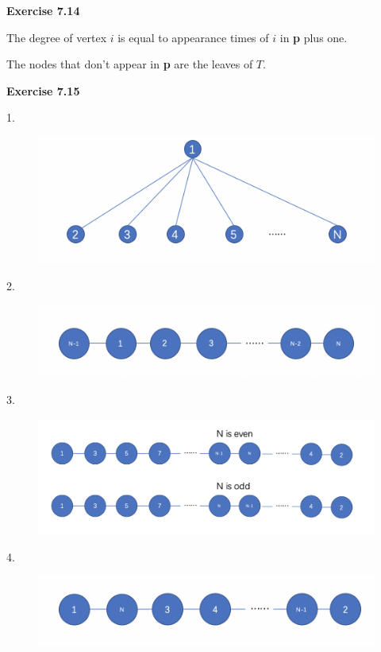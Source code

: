 \documentclass{article} %
\begin{document}
	\textbf{Exercise 7.14}\par
	The degree of vertex $i$ is equal to appearance times of $i$ in \textbf{p} plus one.\par
	The nodes that don't appear in \textbf{p} are the leaves of $T$.\par
	  
	\textbf{Exercise 7.15}\par
	1.\par
  	\begin{figure}[H]
  	\centering
  	\includegraphics[scale=0.6]{7151.png}
  	\caption{}
  	\label{}
  	\end{figure}
	2.\par
  	\begin{figure}[H]
  	\centering
  	\includegraphics[scale=0.6]{7152.png}
  	\caption{}
  	\label{}
  	\end{figure}
	3.\par
  	\begin{figure}[H]
  	\centering
  	\includegraphics[scale=0.6]{7153.png}
  	\caption{}
  	\label{}
  	\end{figure}
	4.\par
  	\begin{figure}[H]
  	\centering
  	\includegraphics[scale=0.6]{7154.png}
  	\caption{}
  	\label{}
  	\end{figure}
\end{document}
